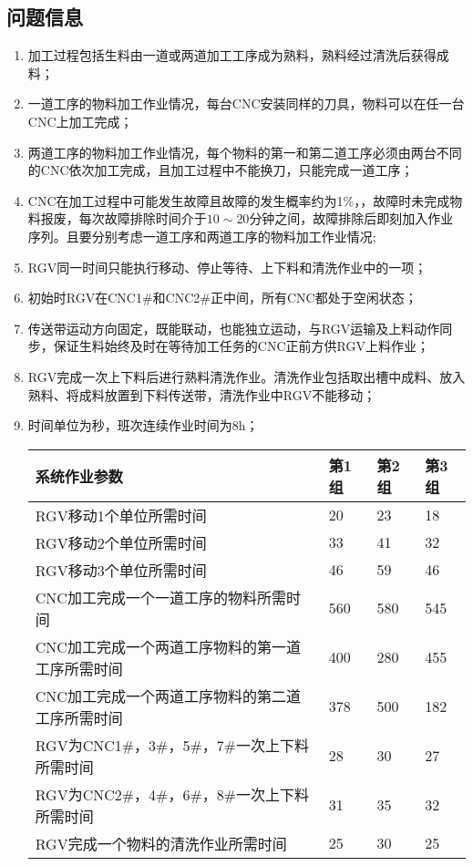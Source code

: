 	\subsection{问题信息}
		\begin{enumerate}
			\item 加工过程包括生料由一道或两道加工工序成为熟料，熟料经过清洗后获得成料；
			\item 一道工序的物料加工作业情况，每台CNC安装同样的刀具，物料可以在任一台CNC上加工完成；
			\item 两道工序的物料加工作业情况，每个物料的第一和第二道工序必须由两台不同的CNC依次加工完成，且加工过程中不能换刀，只能完成一道工序；
			\item CNC在加工过程中可能发生故障且故障的发生概率约为1\%，，故障时未完成物料报废，每次故障排除时间介于\(10\sim20\)分钟之间，故障排除后即刻加入作业序列。且要分别考虑一道工序和两道工序的物料加工作业情况;
			\item RGV同一时间只能执行移动、停止等待、上下料和清洗作业中的一项；
			\item 初始时RGV在CNC1\#和CNC2\#正中间，所有CNC都处于空闲状态；
			\item 传送带运动方向固定，既能联动，也能独立运动，与RGV运输及上料动作同步，保证生料始终及时在等待加工任务的CNC正前方供RGV上料作业；
			\item RGV完成一次上下料后进行熟料清洗作业。清洗作业包括取出槽中成料、放入熟料、将成料放置到下料传送带，清洗作业中RGV不能移动；
			\item 时间单位为秒，班次连续作业时间为8h；
				\begin{table}[htbp]
					\centering
					\caption{智能加工系统作业参数的3组数据表}
					\label{智能加工系统作业参数的3组数据表}
					\begin{longtabu}to
						\toprule
						系统作业参数                          & 第1组 & 第2组 & 第3组 \\ \midrule
						RGV移动1个单位所需时间                   & 20  & 23  & 18  \\
						RGV移动2个单位所需时间                   & 33  & 41  & 32  \\
						RGV移动3个单位所需时间                   & 46  & 59  & 46  \\
						CNC加工完成一个一道工序的物料所需时间            & 560 & 580 & 545 \\
						CNC加工完成一个两道工序物料的第一道工序所需时间       & 400 & 280 & 455 \\
						CNC加工完成一个两道工序物料的第二道工序所需时间       & 378 & 500 & 182 \\
						RGV为CNC1\#，3\#，5\#，7\#一次上下料所需时间 & 28  & 30  & 27  \\
						RGV为CNC2\#，4\#，6\#，8\#一次上下料所需时间 & 31  & 35  & 32  \\
						RGV完成一个物料的清洗作业所需时间              & 25  & 30  & 25  \\ \bottomrule
					\end{longtabu}
				\end{table}
				\newpage
		\end{enumerate}
